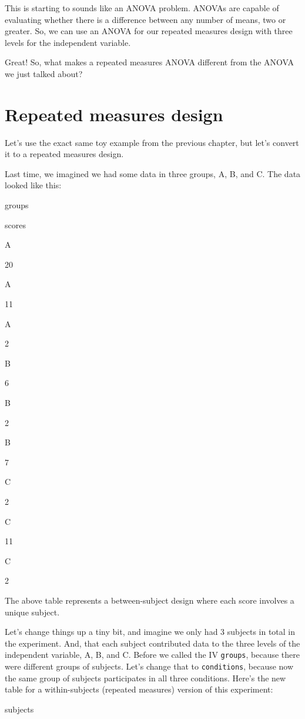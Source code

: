 \documentclass[]{book}
\begin{document}
This is starting to sounds like an ANOVA problem. ANOVAs are capable of evaluating whether there is a difference between any number of means, two or greater. So, we can use an ANOVA for our repeated measures design with three levels for the independent variable.

Great! So, what makes a repeated measures ANOVA different from the ANOVA we just talked about?

\hypertarget{repeated-measures-design}{%
\section{Repeated measures design}\label{repeated-measures-design}}

Let's use the exact same toy example from the previous chapter, but let's convert it to a repeated measures design.

Last time, we imagined we had some data in three groups, A, B, and C. The data looked like this:

groups

scores

A

20

A

11

A

2

B

6

B

2

B

7

C

2

C

11

C

2

The above table represents a between-subject design where each score involves a unique subject.

Let's change things up a tiny bit, and imagine we only had 3 subjects in total in the experiment. And, that each subject contributed data to the three levels of the independent variable, A, B, and C. Before we called the IV \texttt{groups}, because there were different groups of subjects. Let's change that to \texttt{conditions}, because now the same group of subjects participates in all three conditions. Here's the new table for a within-subjects (repeated measures) version of this experiment:

subjects
\end{document}
